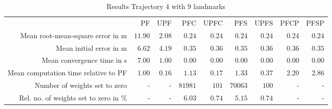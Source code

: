 \begin{table}
\centering
\begin{tabular}{rrrrrrrrr}
 & PF & UPF & PFC & UPFC & PFS & UPFS & PFCP & PFSP \\
Mean root-mean-square error in m & $11.90$ & $2.08$ & $0.24$ & $0.24$ & $0.24$ & $0.24$ & $0.24$ & $0.24$ \\
Mean initial error in m & $6.62$ & $4.19$ & $0.35$ & $0.36$ & $0.35$ & $0.36$ & $0.36$ & $0.35$ \\
Mean convergence time in s & $7.00$ & $1.00$ & $0.00$ & $0.00$ & $0.00$ & $0.00$ & $0.00$ & $0.00$ \\
Mean computation time relative to PF & $1.00$ & $0.16$ & $1.13$ & $0.17$ & $1.33$ & $0.37$ & $2.20$ & $2.86$ \\
Number of weights set to zero & - & - & $81981$ & $101$ & $70063$ & $100$ & - & - \\
Rel. no. of weights set to zero in \% & - & - & $6.03$ & $0.74$ & $5.15$ & $0.74$ & - & - \\
\end{tabular}
\caption{Results Trajectory 4 with 9 landmarks}
\label{table:landmark_positions_4}
\end{table}
